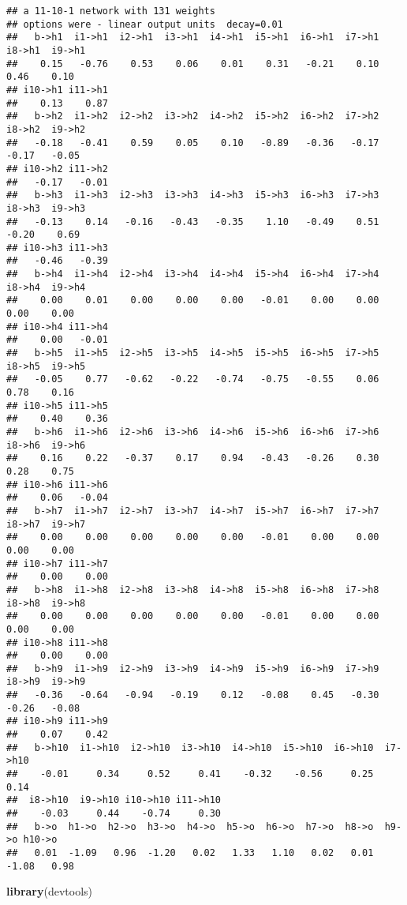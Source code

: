 \documentclass[
]{article}
\newenvironment{Shaded}{\begin{snugshade}}{\end{snugshade}}
\newcommand{\KeywordTok}[1]{\textcolor[rgb]{0.13,0.29,0.53}{\textbf{#1}}}
\newcommand{\NormalTok}[1]{#1}
\begin{document}
\begin{verbatim}
## a 11-10-1 network with 131 weights
## options were - linear output units  decay=0.01
##   b->h1  i1->h1  i2->h1  i3->h1  i4->h1  i5->h1  i6->h1  i7->h1  i8->h1  i9->h1 
##    0.15   -0.76    0.53    0.06    0.01    0.31   -0.21    0.10    0.46    0.10 
## i10->h1 i11->h1 
##    0.13    0.87 
##   b->h2  i1->h2  i2->h2  i3->h2  i4->h2  i5->h2  i6->h2  i7->h2  i8->h2  i9->h2 
##   -0.18   -0.41    0.59    0.05    0.10   -0.89   -0.36   -0.17   -0.17   -0.05 
## i10->h2 i11->h2 
##   -0.17   -0.01 
##   b->h3  i1->h3  i2->h3  i3->h3  i4->h3  i5->h3  i6->h3  i7->h3  i8->h3  i9->h3 
##   -0.13    0.14   -0.16   -0.43   -0.35    1.10   -0.49    0.51   -0.20    0.69 
## i10->h3 i11->h3 
##   -0.46   -0.39 
##   b->h4  i1->h4  i2->h4  i3->h4  i4->h4  i5->h4  i6->h4  i7->h4  i8->h4  i9->h4 
##    0.00    0.01    0.00    0.00    0.00   -0.01    0.00    0.00    0.00    0.00 
## i10->h4 i11->h4 
##    0.00   -0.01 
##   b->h5  i1->h5  i2->h5  i3->h5  i4->h5  i5->h5  i6->h5  i7->h5  i8->h5  i9->h5 
##   -0.05    0.77   -0.62   -0.22   -0.74   -0.75   -0.55    0.06    0.78    0.16 
## i10->h5 i11->h5 
##    0.40    0.36 
##   b->h6  i1->h6  i2->h6  i3->h6  i4->h6  i5->h6  i6->h6  i7->h6  i8->h6  i9->h6 
##    0.16    0.22   -0.37    0.17    0.94   -0.43   -0.26    0.30    0.28    0.75 
## i10->h6 i11->h6 
##    0.06   -0.04 
##   b->h7  i1->h7  i2->h7  i3->h7  i4->h7  i5->h7  i6->h7  i7->h7  i8->h7  i9->h7 
##    0.00    0.00    0.00    0.00    0.00   -0.01    0.00    0.00    0.00    0.00 
## i10->h7 i11->h7 
##    0.00    0.00 
##   b->h8  i1->h8  i2->h8  i3->h8  i4->h8  i5->h8  i6->h8  i7->h8  i8->h8  i9->h8 
##    0.00    0.00    0.00    0.00    0.00   -0.01    0.00    0.00    0.00    0.00 
## i10->h8 i11->h8 
##    0.00    0.00 
##   b->h9  i1->h9  i2->h9  i3->h9  i4->h9  i5->h9  i6->h9  i7->h9  i8->h9  i9->h9 
##   -0.36   -0.64   -0.94   -0.19    0.12   -0.08    0.45   -0.30   -0.26   -0.08 
## i10->h9 i11->h9 
##    0.07    0.42 
##   b->h10  i1->h10  i2->h10  i3->h10  i4->h10  i5->h10  i6->h10  i7->h10 
##    -0.01     0.34     0.52     0.41    -0.32    -0.56     0.25     0.14 
##  i8->h10  i9->h10 i10->h10 i11->h10 
##    -0.03     0.44    -0.74     0.30 
##   b->o  h1->o  h2->o  h3->o  h4->o  h5->o  h6->o  h7->o  h8->o  h9->o h10->o 
##   0.01  -1.09   0.96  -1.20   0.02   1.33   1.10   0.02   0.01  -1.08   0.98
\end{verbatim}

\begin{Shaded}
\begin{Highlighting}[]
\KeywordTok{library}\NormalTok{(devtools)}
\end{Highlighting}
\end{Shaded}
\end{document}
